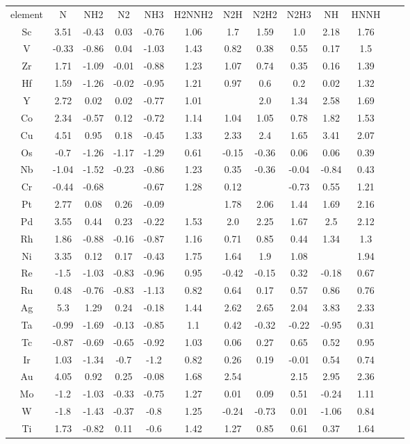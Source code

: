 \begin{center}
\begin{tabular}{| c | c | c | c | c | c | c | c | c | c | c | c | c |}
\\\hline
element & N & NH2 & N2 & NH3 & H2NNH2 & N2H & N2H2 & N2H3 & NH & HNNH\hline
\\
Sc & 3.51 & -0.43 & 0.03 & -0.76 & 1.06 & 1.7 & 1.59 & 1.0 & 2.18 & 1.76 \\
V & -0.33 & -0.86 & 0.04 & -1.03 & 1.43 & 0.82 & 0.38 & 0.55 & 0.17 & 1.5 \\
Zr & 1.71 & -1.09 & -0.01 & -0.88 & 1.23 & 1.07 & 0.74 & 0.35 & 0.16 & 1.39 \\
Hf & 1.59 & -1.26 & -0.02 & -0.95 & 1.21 & 0.97 & 0.6 & 0.2 & 0.02 & 1.32 \\
Y & 2.72 & 0.02 & 0.02 & -0.77 & 1.01 &  & 2.0 & 1.34 & 2.58 & 1.69 \\
Co & 2.34 & -0.57 & 0.12 & -0.72 & 1.14 & 1.04 & 1.05 & 0.78 & 1.82 & 1.53 \\
Cu & 4.51 & 0.95 & 0.18 & -0.45 & 1.33 & 2.33 & 2.4 & 1.65 & 3.41 & 2.07 \\
Os & -0.7 & -1.26 & -1.17 & -1.29 & 0.61 & -0.15 & -0.36 & 0.06 & 0.06 & 0.39 \\
Nb & -1.04 & -1.52 & -0.23 & -0.86 & 1.23 & 0.35 & -0.36 & -0.04 & -0.84 & 0.43 \\
Cr & -0.44 & -0.68 &  & -0.67 & 1.28 & 0.12 &  & -0.73 & 0.55 & 1.21 \\
Pt & 2.77 & 0.08 & 0.26 & -0.09 &  & 1.78 & 2.06 & 1.44 & 1.69 & 2.16 \\
Pd & 3.55 & 0.44 & 0.23 & -0.22 & 1.53 & 2.0 & 2.25 & 1.67 & 2.5 & 2.12 \\
Rh & 1.86 & -0.88 & -0.16 & -0.87 & 1.16 & 0.71 & 0.85 & 0.44 & 1.34 & 1.3 \\
Ni & 3.35 & 0.12 & 0.17 & -0.43 & 1.75 & 1.64 & 1.9 & 1.08 &  & 1.94 \\
Re & -1.5 & -1.03 & -0.83 & -0.96 & 0.95 & -0.42 & -0.15 & 0.32 & -0.18 & 0.67 \\
Ru & 0.48 & -0.76 & -0.83 & -1.13 & 0.82 & 0.64 & 0.17 & 0.57 & 0.86 & 0.76 \\
Ag & 5.3 & 1.29 & 0.24 & -0.18 & 1.44 & 2.62 & 2.65 & 2.04 & 3.83 & 2.33 \\
Ta & -0.99 & -1.69 & -0.13 & -0.85 & 1.1 & 0.42 & -0.32 & -0.22 & -0.95 & 0.31 \\
Tc & -0.87 & -0.69 & -0.65 & -0.92 & 1.03 & 0.06 & 0.27 & 0.65 & 0.52 & 0.95 \\
Ir & 1.03 & -1.34 & -0.7 & -1.2 & 0.82 & 0.26 & 0.19 & -0.01 & 0.54 & 0.74 \\
Au & 4.05 & 0.92 & 0.25 & -0.08 & 1.68 & 2.54 &  & 2.15 & 2.95 & 2.36 \\
Mo & -1.2 & -1.03 & -0.33 & -0.75 & 1.27 & 0.01 & 0.09 & 0.51 & -0.24 & 1.11 \\
W & -1.8 & -1.43 & -0.37 & -0.8 & 1.25 & -0.24 & -0.73 & 0.01 & -1.06 & 0.84 \\
Ti & 1.73 & -0.82 & 0.11 & -0.6 & 1.42 & 1.27 & 0.85 & 0.61 & 0.37 & 1.64 \\
\hline
\end{tabular}
\end{center}